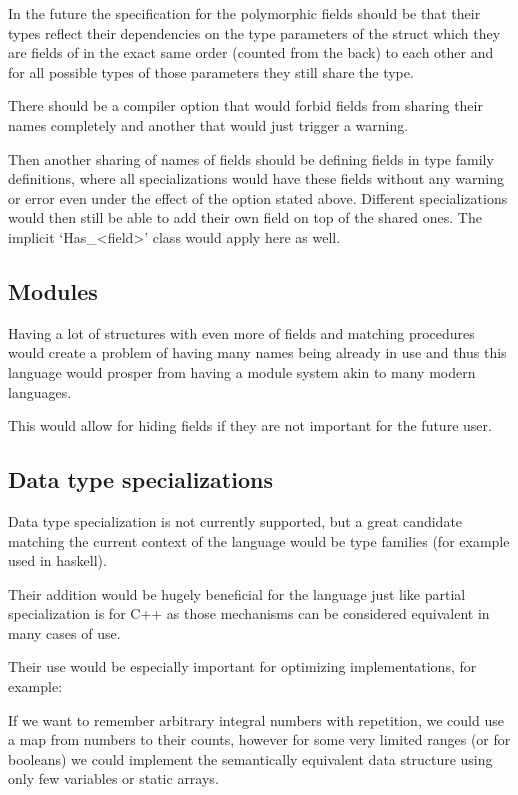 In the future the specification for the polymorphic fields should be that their types reflect their dependencies on the type
parameters of the struct which they are fields of in the exact same order (counted from the back) to each other and for all possible types of those parameters they
still share the type.

There should be a compiler option that would forbid fields from sharing their names completely and another that would just trigger a warning.

Then another sharing of names of fields should be defining fields in type family definitions, where all specializations would
have these fields without any warning or error even under the effect of the option stated above. Different specializations would
then still be able to add their own field on top of the shared ones. The implicit `Has_<field>' class would apply here as well.

\subsection{Modules}

Having a lot of structures with even more of fields and matching procedures would create a problem of having many names being already
in use and thus this language would prosper from having a module system akin to many modern languages.

This would allow for hiding fields if they are not important for the future user.

\subsection{Data type specializations}

Data type specialization is not currently supported, but a great candidate matching the current context of the language would be
type families (for example used in haskell).

Their addition would be hugely beneficial for the language just like partial specialization is for C++ as
those mechanisms can be considered equivalent in many cases of use.

Their use would be especially important for optimizing implementations, for example:

If we want to remember arbitrary integral numbers with repetition, we could use a map from numbers to their counts,
however for some very limited ranges (or for booleans) we could implement the semantically equivalent data structure using
only few variables or static arrays.

